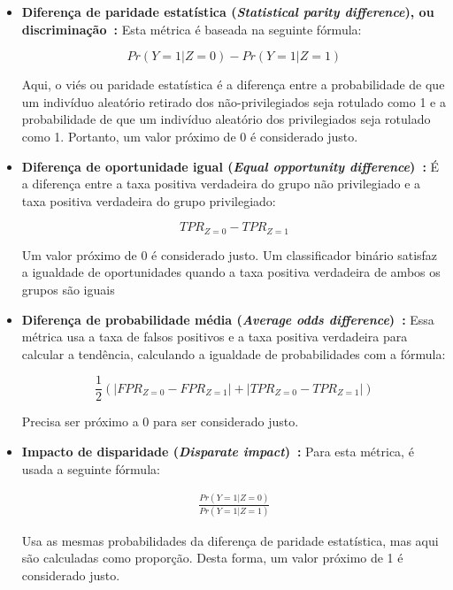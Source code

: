 \documentclass[portugues]{ic-tese}
\begin{document}
\begin{itemize}
\item \textbf{Diferença de paridade estatística (\textit{Statistical parity difference}), ou discriminação~\citep{Zemel_2013}:} Esta métrica é baseada na seguinte fórmula:

\begin{equation}
Pr(Y=1|Z=0)-Pr(Y=1|Z=1)
\end{equation}
 
Aqui, o viés ou paridade estatística é a diferença entre a probabilidade de que um indivíduo aleatório retirado dos não-privilegiados seja rotulado como 1 e a probabilidade de que um indivíduo aleatório dos privilegiados seja rotulado como 1. Portanto, um valor próximo de 0 é considerado justo.

\item \textbf{Diferença de oportunidade igual (\textit{Equal opportunity difference})~\citep{Biswas_2020}:} É a diferença entre a taxa positiva verdadeira do grupo não privilegiado e a taxa positiva verdadeira do grupo privilegiado:

\begin{equation}
TPR_{Z=0} - TPR_{Z=1}
\end{equation}
 
Um valor próximo de 0 é considerado justo. Um classificador binário satisfaz a igualdade de oportunidades quando a taxa positiva verdadeira de ambos os grupos são iguais~\citep{Hardt_2016}

\item \textbf{Diferença de probabilidade média (\textit{Average odds difference})~\citep{Biswas_2020}:} Essa métrica usa a taxa de falsos positivos e a taxa positiva verdadeira para calcular a tendência, calculando a igualdade de probabilidades com a fórmula:

\begin{equation}
\frac{1}{2}(|FPR_{Z=0} - FPR_{Z=1}|+|TPR_{Z=0} - TPR_{Z=1}|)
\end{equation}
 
Precisa ser próximo a 0 para ser considerado justo.

\item \textbf{Impacto de disparidade (\textit{Disparate impact})~\citep{Biswas_2020}:} Para esta métrica, é usada a seguinte fórmula:

\begin{align*}
\frac{Pr(Y=1|Z=0)}{Pr(Y=1|Z=1)}
\end{align*}

Usa as mesmas probabilidades da diferença de paridade estatística, mas aqui são calculadas como proporção. Desta forma, um valor próximo de 1 é considerado justo.


\end{itemize}
\end{document}
